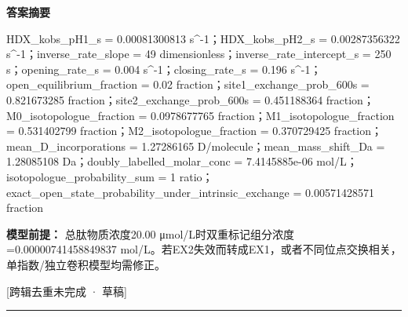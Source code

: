 \documentclass[UTF8,11pt,a4paper]{ctexart}
\begin{document}
\noindent\textbf{答案摘要}\par
HDX\_kobs\_pH1\_s = 0.00081300813 s\textasciicircum{}-1；HDX\_kobs\_pH2\_s = 0.00287356322 s\textasciicircum{}-1；inverse\_rate\_slope = 49 dimensionless；inverse\_rate\_intercept\_s = 250 s；opening\_rate\_s = 0.004 s\textasciicircum{}-1；closing\_rate\_s = 0.196 s\textasciicircum{}-1；open\_equilibrium\_fraction = 0.02 fraction；site1\_exchange\_prob\_600s = 0.821673285 fraction；site2\_exchange\_prob\_600s = 0.451188364 fraction；M0\_isotopologue\_fraction = 0.0978677765 fraction；M1\_isotopologue\_fraction = 0.531402799 fraction；M2\_isotopologue\_fraction = 0.370729425 fraction；mean\_D\_incorporations = 1.27286165 D/molecule；mean\_mass\_shift\_Da = 1.28085108 Da；doubly\_labelled\_molar\_conc = 7.4145885e-06 mol/L；isotopologue\_probability\_sum = 1 ratio；exact\_open\_state\_probability\_under\_intrinsic\_exchange = 0.00571428571 fraction\par
\noindent\textbf{模型前提：}
总肽物质浓度20.00 μmol/L时双重标记组分浓度=0.00000741458849837 mol/L。若EX2失效而转成EX1，或者不同位点交换相关，单指数/独立卷积模型均需修正。\par
\noindent\textcolor{red!65!black}{[跨辑去重未完成 · 草稿]} \par
\medskip\hrule\medskip
{}
\end{document}
